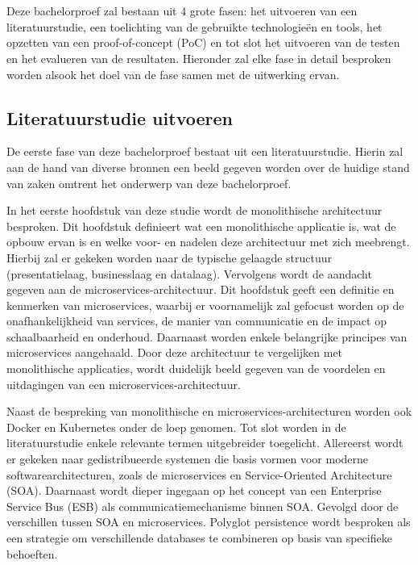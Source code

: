 
\chapter{}%
\label{ch:methodologie}

Deze bachelorproef zal bestaan uit 4 grote fasen: het uitvoeren van een literatuurstudie, een toelichting van de gebruikte technologieën en tools, het opzetten van een proof-of-concept (PoC) en tot slot het uitvoeren van de testen en het evalueren van de resultaten. Hieronder zal elke fase in detail besproken worden alsook het doel van de fase samen met de uitwerking ervan.

\section{Literatuurstudie uitvoeren}

De eerste fase van deze bachelorproef bestaat uit een literatuurstudie. Hierin zal aan de hand van diverse bronnen een beeld gegeven worden over de huidige stand van zaken omtrent het onderwerp van deze bachelorproef.\newline 

In het eerste hoofdstuk van deze studie wordt de monolithische architectuur besproken. Dit hoofdstuk definieert wat een monolithische applicatie is, wat de opbouw ervan is en welke voor- en nadelen deze architectuur met zich meebrengt. Hierbij zal er gekeken worden naar de typische gelaagde structuur (presentatielaag, businesslaag en datalaag). Vervolgens wordt de aandacht gegeven aan de microservices-architectuur. Dit hoofdstuk geeft een definitie en kenmerken van microservices, waarbij er voornamelijk zal gefocust worden op de onafhankelijkheid van services, de manier van communicatie en de impact op schaalbaarheid en onderhoud. Daarnaast worden enkele belangrijke principes van microservices aangehaald. Door deze architectuur te vergelijken met monolithische applicaties, wordt duidelijk beeld gegeven van de voordelen en uitdagingen van een microservices-architectuur.\newline

Naast de bespreking van monolithische en microservices-architecturen worden ook Docker en Kubernetes onder de loep genomen. Tot slot worden in de literatuurstudie enkele relevante termen uitgebreider toegelicht. Allereerst wordt er gekeken naar gedistribueerde systemen die basis vormen voor moderne softwarearchitecturen, zoals de microservices en Service-Oriented Architecture (SOA). Daarnaast wordt dieper ingegaan op het concept van een Enterprise Service Bus (ESB) als communicatiemechanisme binnen SOA. Gevolgd door de verschillen tussen SOA en microservices. Polyglot persistence wordt besproken als een strategie om verschillende databases te combineren op basis van specifieke behoeften.

